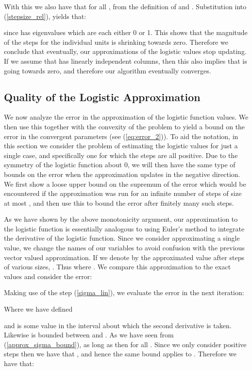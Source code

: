 \documentclass[11pt]{article}
\begin{document}
With this we also have that  for all , from the definition of  and .  Substitution into (\ref{stepsize_rel}), yields that:

since  has eigenvalues which are each either 0 or 1.  This shows that the magnitude of the steps for the individual units is shrinking towards zero.  Therefore we  conclude that eventually, our approximations of the logistic values stop updating.  If we assume that  has  linearly independent columns, then this also implies that  is going towards zero, and therefore our algorithm eventually converges.

\subsection{Quality of the Logistic Approximation}\label{sec:p2error}

We now analyze the error in the approximation of the logistic function values.  We then use this together with  the convexity of the problem to  yield a bound on the error in the convergent parameters (see (\ref{eq:error_2})).  To aid the notation, in this section we consider the problem of estimating the logistic values for just a single case, and specifically one for which the steps are all positive.  Due to the symmetry of the logistic function about 0, we will then have the same type of bounds on the error when the approximation updates in the negative direction.  We first show a loose upper bound on the supremum of the error which would be encountered if the approximation was run for an infinite number of steps of size at most , and then use this to bound the error after finitely many such steps.

As we have shown by the above monotonicity argument, our approximation to the logistic function is essentially analogous to using Euler's method to integrate the derivative of the logistic function.  Since we consider approximating a single value, we change the names of our variables to avoid confusion with the previous vector valued approximation.  If we denote by  the approximated value after  steps of various sizes,  .  Thus   where . We  compare this approximation to the exact values and consider the error:


Making use of the step (\ref{sigma_lin}), we  evaluate the error in the next iteration:

Where we have defined


\noindent and  is some value in the interval about which the second derivative is taken.  Likewise  is bounded between  and .  As we have seen from (\ref{approx_sigma_bound}), as long as  then  for all .  Since we only consider positive steps  then we have that , and hence the same bound applies to .  Therefore we have that:
\end{document}
